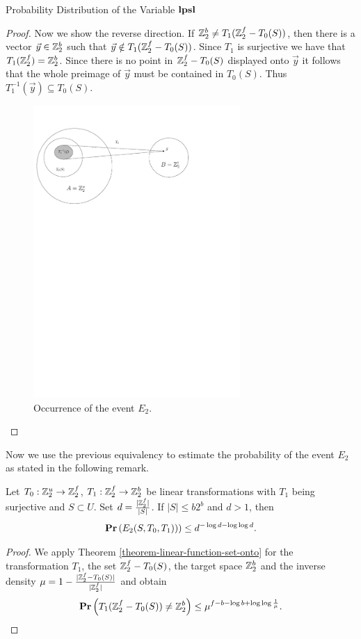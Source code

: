 \begin{section}{Probability Distribution of the Variable \texorpdfstring{$\mathbf{lpsl}$}{lpsl}}
\begin{proof}
Now we show the reverse direction. If $\mathbb{Z}_{2}^{b} \neq T_1(\mathbb{Z}_{2}^{f} - T_0(S))$, then there is a vector $\vec{y} \in \mathbb{Z}_{2}^{b}$ such that $\vec{y} \notin T_1(\mathbb{Z}_{2}^{f} - T_0(S))$. Since $T_1$ is surjective we have that $T_1(\mathbb{Z}_{2}^{f}) = \mathbb{Z}_{2}^{b}$. Since there is no point in $\mathbb{Z}_{2}^{f} - T_0(S)$ displayed onto $\vec{y}$ it follows that the whole preimage of $\vec{y}$ must be contained in $T_0(S)$. Thus $T_1^{-1}(\vec{y}) \subseteq T_0(S)$.

\begin{figure}
  \centering
    \includegraphics[width=0.7\textwidth]{images/e2}

  \caption{Occurrence of the event $E_2$.}
\end{figure}

\end{proof}

Now we use the previous equivalency to estimate the probability of the event $E_2$ as stated in the following remark. 
\begin{remark}
\label{remark-e2-probability}
Let $T_0: \mathbb{Z}_{2}^{u} \rightarrow \mathbb{Z}_{2}^{f}$, $T_1: \mathbb{Z}_{2}^{f} \rightarrow \mathbb{Z}_{2}^{b}$ be linear transformations with $T_1$ being surjective and $S \subset U$. Set $d = \frac{|\mathbb{Z}_{2}^{f}|}{|S|}$. If $|S| \leq b2 ^ b$ and $d > 1$, then 
\[
	\mathbf{Pr}\left(E_2(S, T_0, T_1))\right) \leq d^{-\log d - \log \log d} \text{.}
\]
\end{remark}
\begin{proof}
We apply Theorem \ref{theorem-linear-function-set-onto} for the transformation $T_1$, the set $\mathbb{Z}_{2}^{f} - T_0(S)$, the target space $\mathbb{Z}_{2}^{b}$ and the inverse density $\mu = 1 - \frac{|\mathbb{Z}_{2}^{f} - T_0(S)|}{|\mathbb{Z}_{2}^{f}|}$ and obtain
\[
	\mathbf{Pr}\left(T_1(\mathbb{Z}_{2}^{f} - T_0(S)) \neq \mathbb{Z}_{2}^{b}\right) \leq \mu ^ {f - b - \log b + \log \log \frac{1}{\mu}} \text{.}
\]


\end{proof}
\end{section}
